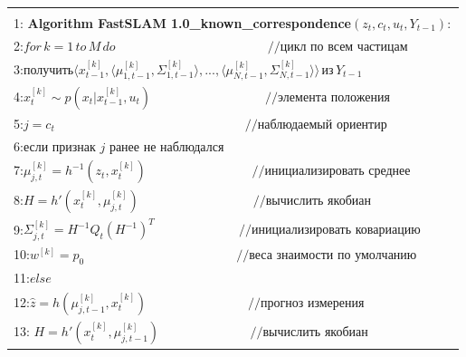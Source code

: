 \documentclass[10pt,a4paper]{article}
\begin{document}
\begin{table}[H]
\begin{center}
\begin{tabular}{|l|}
\hline
{}\\
1:\textbf{ Algorithm FastSLAM 1.0\_known\_correspondence}$(z_t,c_t,u_t,Y_{t-1}):$\\
2:\hspace{5mm}$\textit{for}\,k=1\,\textit{to}\,M\,\textit{do}\qquad\qquad\qquad\qquad\qquad\qquad//\textit{цикл по всем частицам}$\\
3:\hspace{10mm}$\textit{получить}\langle x_{t-1}^{[k]},\langle\mu_{1,t-1}^{[k]},\varSigma_{1,t-1}^{[k]}\rangle,...,\langle\mu_{N,t-1}^{[k]},\varSigma_{N,t-1}^{[k]}\rangle\rangle\,\textit{из}\,Y_{t-1}$\\
4:\hspace{10mm}$x_t^{[k]}\sim p(x_t|x_{t-1}^{[k]},u_t)\qquad\qquad\quad\qquad\qquad//\textit{элемента положения}$\\
5:\hspace{10mm}$j=c_t\qquad\qquad\qquad\qquad\quad\qquad \qquad\qquad//\textit{наблюдаемый ориентир}$\\
6:\hspace{10mm}$\textit{если признак j ранее не наблюдался}$\\
7:\hspace{13mm}$\mu_{j,t}^{[k]}=h^{-1}(z_t,x_t^{[k]})\,\,\qquad\qquad\qquad\qquad//\textit{инициализировать среднее}$\\
8:\hspace{13mm}$H=h'(x_t^{[k]},\mu_{j,t}^{[k]})\qquad\qquad\qquad\qquad\quad//\textit{вычислить якобиан}$\\
9:\hspace{13mm}$\varSigma_{j,t}^{[k]}=H^{-1}Q_t(H^{-1})^T\,\,\,\,\qquad\qquad\qquad//\textit{инициализировать ковариацию}$\\
10:\hspace{12mm}$w^{[k]}=p_0\,\,\,\,\,\,\qquad\qquad\quad\qquad\qquad\qquad//\textit{веса знаимости по умолчанию}$\\
11:\hspace{9mm}$\textit{else}$\\
12:\hspace{13mm}$\hat{z}=h(\mu_{j,t-1}^{[k]},x_t^{[k]})\qquad\qquad\qquad\qquad//\textit{прогноз измерения}$\\
13:\hspace{12mm}
$H=h'(x_t^{[k]},\mu_{j,t-1}^{[k]})\,\qquad\qquad\qquad\quad//\textit{вычислить якобиан}$\\

\end{tabular}
\end{center}
\end{table}
\end{document}
